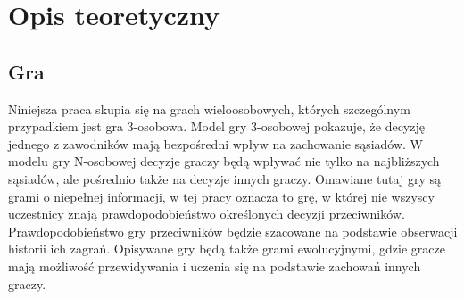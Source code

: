 \chapter{Opis teoretyczny}
\label{cha:opis_teor}

\section{Gra}
\label{sec:gra}
Niniejsza praca skupia się na grach wieloosobowych, których szczególnym przypadkiem jest gra 3-osobowa. Model gry 3-osobowej pokazuje, że decyzję jednego z zawodników mają bezpośredni wpływ na zachowanie sąsiadów. W modelu gry N-osobowej decyzje graczy będą wpływać nie tylko na najbliższych sąsiadów, ale pośrednio także na decyzje innych graczy.
Omawiane tutaj gry są grami o niepełnej informacji, w tej pracy oznacza to grę, w której nie wszyscy uczestnicy znają prawdopodobieństwo określonych decyzji przeciwników. Prawdopodobieństwo gry przeciwników będzie szacowane na podstawie obserwacji historii ich zagrań.
Opisywane gry będą także grami ewolucyjnymi, gdzie gracze mają możliwość przewidywania i uczenia się na podstawie zachowań innych graczy.

